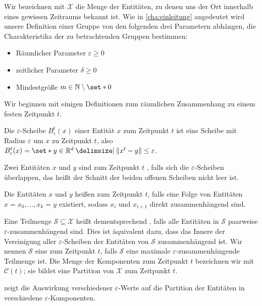 
Wir bezeichnen mit $\mathcal{X}$ die Menge der Entitäten, zu denen uns der Ort innerhalb eines gewissen Zeitraums bekannt ist.
Wie in \cref{cha:einleitung} angedeutet wird unsere Definition einer Gruppe von den folgenden drei Parametern abhängen, die Charakteristika der zu betrachtenden Gruppen bestimmen:
\begin{itemize}
	\item Räumlicher Parameter $\varepsilon \ge 0$
	\item zeitlicher Parameter $\delta \ge 0$
	\item Mindestgröße $m \in \mathbb{N}\setminus \set*{0}$
\end{itemize}
Wir beginnen mit einigen Definitionen zum räumlichen Zusammenhang zu einem festen Zeitpunkt $t$.
\begin{definition}[{name=[Epsilon-Zusammenhang]}]
	Die $\varepsilon$-Scheibe $B_\varepsilon^t(x)$ einer Entität $x$ zum Zeitpunkt $t$ ist eine Scheibe mit Radius $\varepsilon$ um $x$ zu Zeitpunkt $t$, also $B_\varepsilon^t(x) = \set*{y \in \mathbb{R}^d \given \norm*{x^t-y} \le \varepsilon}$.
	
	Zwei Entitäten $x$ und $y$ sind zum Zeitpunkt $t$ , falls sich die $\varepsilon$-Scheiben überlappen, das heißt der Schnitt der beiden offenen Scheiben nicht leer ist.
	
	Die Entitäten $x$ und $y$ heißen  zum Zeitpunkt $t$, falls eine Folge von Entitäten $x=x_0, \ldots, x_k = y$ existiert, sodass $x_i$ und $x_{i+1}$ direkt zusammenhängend sind.
\end{definition}

Eine Teilmenge $\mathcal{S} \subseteq \mathcal{X}$ heißt dementsprechend , falls alle Entitäten in $\mathcal{S}$ paarweise $\varepsilon$-zusammenhängend sind.
Dies ist äquivalent dazu, dass das Innere der Vereinigung aller $\varepsilon$-Scheiben der Entitäten von $\mathcal{S}$ zusammenhängend ist.
Wir nennen $\mathcal{S}$ eine  zum Zeitpunkt $t$, falls $\mathcal{S}$ eine maximale $\varepsilon$-zusammenhängende Teilmenge ist.
Die Menge der Komponenten zum Zeitpunkt $t$ bezeichnen wir mit $\mathcal{C}(t)$; sie bildet eine Partition von $\mathcal{X}$ zum Zeitpunkt $t$.

 zeigt die Auswirkung verschiedener $\varepsilon$-Werte auf die Partition der Entitäten in verschiedene $\varepsilon$-Komponenten.

